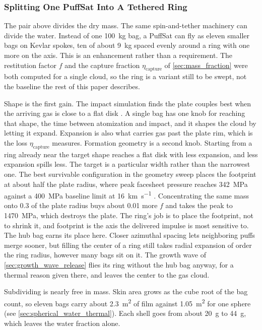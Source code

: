 \documentclass{article}
\begin{document}
\subsubsection{Splitting One PuffSat Into A Tethered Ring}\label{sec:tethered_ring}

The pair above divides the dry mass. The same spin-and-tether machinery can divide the water. Instead of one \SI{100}{\kilo\gram} bag, a PuffSat can fly as eleven smaller bags on Kevlar spokes, ten of about \SI{9}{\kilo\gram} spaced evenly around a ring with one more on the axis. This is an enhancement rather than a requirement. The restitution factor $f$ and the capture fraction $\eta_{\mathrm{capture}}$ of \autoref{sec:mass_fraction} were both computed for a single cloud, so the ring is a variant still to be swept, not the baseline the rest of this paper describes.

Shape is the first gain. The impact simulation finds the plate couples best when the arriving gas is close to a flat disk \cite{Katz_puffsat_impact_sim_2026}. A single bag has one knob for reaching that shape, the time between atomization and impact, and it shapes the cloud by letting it expand. Expansion is also what carries gas past the plate rim, which is the loss $\eta_{\mathrm{capture}}$ measures. Formation geometry is a second knob. Starting from a ring already near the target shape reaches a flat disk with less expansion, and less expansion spills less. The target is a particular width rather than the narrowest one. The best survivable configuration in the geometry sweep places the footprint at about half the plate radius, where peak facesheet pressure reaches \SI{342}{\mega\pascal} against a \SI{400}{\mega\pascal} baseline limit at \SI{16}{\kilo\meter\per\second} \cite{Katz_puffsat_impact_sim_2026}. Concentrating the same mass onto \num{0.3} of the plate radius buys about \num{0.01} more $f$ and takes the peak to \SI{1470}{\mega\pascal}, which destroys the plate. The ring's job is to place the footprint, not to shrink it, and footprint is the axis the delivered impulse is most sensitive to. The hub bag earns its place here. Closer azimuthal spacing lets neighboring puffs merge sooner, but filling the center of a ring still takes radial expansion of order the ring radius, however many bags sit on it. The growth wave of \autoref{sec:growth_wave_release} flies its ring without the hub bag anyway, for a thermal reason given there, and leaves the center to the gas cloud.

Subdividing is nearly free in mass. Skin area grows as the cube root of the bag count, so eleven bags carry about \SI{2.3}{\square\meter} of film against \SI{1.05}{\square\meter} for one sphere (see \autoref{sec:spherical_water_thermal}). Each shell goes from about \SI{20}{\gram} to \SI{44}{\gram}, which leaves the water fraction alone.
\end{document}
